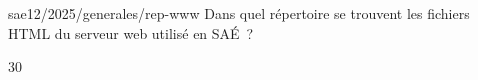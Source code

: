 \begin{question}{sae12/2025/generales/rep-www}
  Dans quel répertoire se trouvent les fichiers HTML du serveur web
  utilisé en SAÉ~?
  \begin{reponses}{3}{0}
  \end{reponses}
\end{question}
